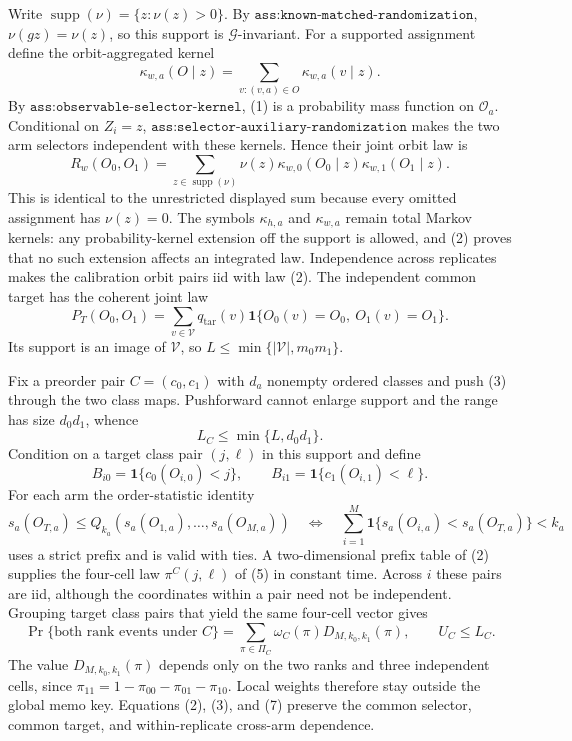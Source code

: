 Write \(\operatorname{supp}(\nu)=\{z:\nu(z)>0\}\). By \(\texttt{ass:known-matched-randomization}\), \(\nu(gz)=\nu(z)\), so this support is \(\mathcal G\)-invariant. For a supported assignment define the orbit-aggregated kernel
\[
\kappa_{w,a}(O\mid z)=\sum_{v:(v,a)\in O}\kappa_{w,a}(v\mid z).
\tag{1}
\]
By \(\texttt{ass:observable-selector-kernel}\), (1) is a probability mass function on \(\mathcal O_a\). Conditional on \(Z_i=z\), \(\texttt{ass:selector-auxiliary-randomization}\) makes the two arm selectors independent with these kernels. Hence their joint orbit law is
\[
R_w(O_0,O_1)=\sum_{z\in\operatorname{supp}(\nu)}\nu(z)
\kappa_{w,0}(O_0\mid z)\kappa_{w,1}(O_1\mid z).
\tag{2}
\]
This is identical to the unrestricted displayed sum because every omitted assignment has \(\nu(z)=0\). The symbols \(\kappa_{h,a}\) and \(\kappa_{w,a}\) remain total Markov kernels: any probability-kernel extension off the support is allowed, and (2) proves that no such extension affects an integrated law. Independence across replicates makes the calibration orbit pairs iid with law (2). The independent common target has the coherent joint law
\[
P_T(O_0,O_1)=\sum_{v\in\mathcal V}q_{\mathrm{tar}}(v)
\mathbf 1\{O_0(v)=O_0,\ O_1(v)=O_1\}.
\tag{3}
\]
Its support is an image of \(\mathcal V\), so \(L\le\min\{|\mathcal V|,m_0m_1\}\).

Fix a preorder pair \(C=(c_0,c_1)\) with \(d_a\) nonempty ordered classes and push (3) through the two class maps. Pushforward cannot enlarge support and the range has size \(d_0d_1\), whence
\[
L_C\le\min\{L,d_0d_1\}.
\tag{4}
\]
Condition on a target class pair \((j,\ell)\) in this support and define
\[
B_{i0}=\mathbf 1\{c_0(O_{i,0})<j\},\qquad
B_{i1}=\mathbf 1\{c_1(O_{i,1})<\ell\}.
\tag{5}
\]
For each arm the order-statistic identity
\[
s_a(O_{T,a})\le Q_{k_a}(s_a(O_{1,a}),\ldots,s_a(O_{M,a}))
\quad\Longleftrightarrow\quad
\sum_{i=1}^M\mathbf 1\{s_a(O_{i,a})<s_a(O_{T,a})\}<k_a
\tag{6}
\]
uses a strict prefix and is valid with ties. A two-dimensional prefix table of (2) supplies the four-cell law \(\pi^C(j,\ell)\) of (5) in constant time. Across \(i\) these pairs are iid, although the coordinates within a pair need not be independent. Grouping target class pairs that yield the same four-cell vector gives
\[
\Pr\{\text{both rank events under }C\}
=\sum_{\pi\in\Pi_C}\omega_C(\pi)D_{M,k_0,k_1}(\pi),
\qquad U_C\le L_C.
\tag{7}
\]
The value \(D_{M,k_0,k_1}(\pi)\) depends only on the two ranks and three independent cells, since \(\pi_{11}=1-\pi_{00}-\pi_{01}-\pi_{10}\). Local weights therefore stay outside the global memo key. Equations (2), (3), and (7) preserve the common selector, common target, and within-replicate cross-arm dependence.

